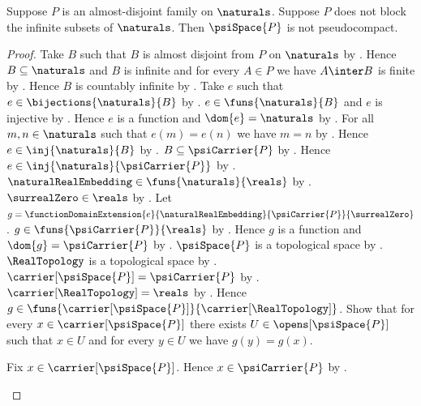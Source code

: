 \begin{theorem}\label{psi_not_blocking_implies_not_pseudocompact}
    Suppose $P$ is an almost-disjoint family on $\naturals$.
    Suppose $P$ does not block the infinite subsets of $\naturals$.
    Then $\psiSpace{P}$ is not pseudocompact.
\end{theorem}
\begin{proof}
    Take $B$ such that $B$ is almost disjoint from $P$ on $\naturals$
        by .
    Hence $B\subseteq\naturals$ and $B$ is infinite and
        for every $A\in P$ we have $A\inter B$ is finite
        by .
    Hence $B$ is countably infinite by
        .
    Take $e$ such that $e\in\bijections{\naturals}{B}$ by
        .
    $e\in\funs{\naturals}{B}$ and $e$ is injective by
        .
    Hence $e$ is a function and $\dom{e}=\naturals$ by
        .
    For all $m,n\in\naturals$ such that $e(m)=e(n)$ we have $m=n$ by
        .
    Hence $e\in\inj{\naturals}{B}$ by .
    $B\subseteq\psiCarrier{P}$ by
        .
    Hence $e\in\inj{\naturals}{\psiCarrier{P}}$ by
        .
    $\naturalRealEmbedding\in\funs{\naturals}{\reals}$ by
        .
    $\surrealZero\in\reals$ by .
    Let $g=\functionDomainExtension{e}{\naturalRealEmbedding}
        {\psiCarrier{P}}{\surrealZero}$.
    $g\in\funs{\psiCarrier{P}}{\reals}$ by
        .
    Hence $g$ is a function and $\dom{g}=\psiCarrier{P}$ by
        .
    $\psiSpace{P}$ is a topological space by
        .
    $\RealTopology$ is a topological space by
        .
    $\carrier[\psiSpace{P}]=\psiCarrier{P}$ by
        .
    $\carrier[\RealTopology]=\reals$ by .
    Hence $g\in\funs{\carrier[\psiSpace{P}]}
        {\carrier[\RealTopology]}$.
    Show that for every $x\in\carrier[\psiSpace{P}]$ there exists
        $U\in\opens[\psiSpace{P}]$ such that $x\in U$ and
        for every $y\in U$ we have $g(y)=g(x)$.
    \begin{subproof}
        Fix $x\in\carrier[\psiSpace{P}]$.
        Hence $x\in\psiCarrier{P}$ by .

\end{subproof}
\end{proof}
